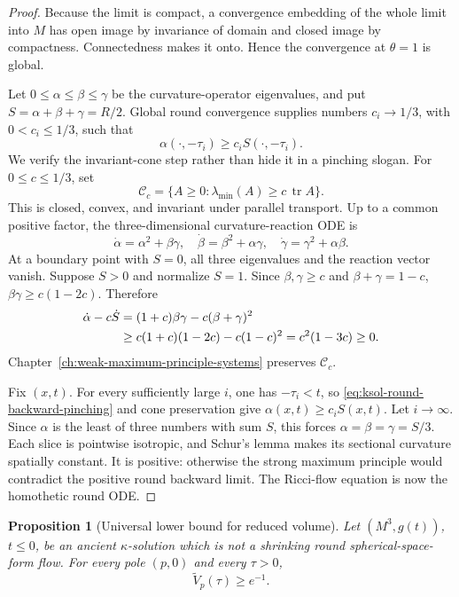 \documentclass[10pt]{coll-l}
\newtheorem{proposition}[theorem]{Proposition}
\theoremstyle{definition}
\theoremstyle{remark}
\numberwithin{section}{chapter}
\numberwithin{equation}{chapter}
\begin{document}
\begin{proof}
Because the limit is compact, a convergence embedding of the whole limit
into $M$ has open image by invariance of domain and closed image by
compactness.  Connectedness makes it onto.  Hence the convergence at
$\theta=1$ is global.

Let $0\leq\alpha\leq\beta\leq\gamma$ be the curvature-operator eigenvalues,
and put $S=\alpha+\beta+\gamma=R/2$.  Global round convergence supplies
numbers $c_i\to1/3$, with $0<c_i\leq1/3$, such that
\begin{equation}
              \alpha(\cdot,-\tau_i)\geq c_iS(\cdot,-\tau_i).
                                                        \label{eq:ksol-round-backward-pinching}
\end{equation}
We verify the invariant-cone step rather than hide it in a pinching slogan.
For $0\leq c\leq1/3$, set
\[
 \mathcal C_c=\{A\geq0:\lambda_{\min}(A)\geq c\,\operatorname{tr}A\}.
\]
This is closed, convex, and invariant under parallel transport.  Up to a
common positive factor, the three-dimensional curvature-reaction ODE is
\[
 \dot\alpha=\alpha^2+\beta\gamma,\quad
 \dot\beta=\beta^2+\alpha\gamma,\quad
 \dot\gamma=\gamma^2+\alpha\beta.
\]
At a boundary point with $S=0$, all three eigenvalues and the reaction
vector vanish.  Suppose $S>0$ and normalize $S=1$.  Since
$\beta,\gamma\geq c$ and $\beta+\gamma=1-c$,
$\beta\gamma\geq c(1-2c)$.  Therefore
\begin{align}
 \dot\alpha-c\dot S
  &=(1+c)\beta\gamma-c(\beta+\gamma)^2 \notag\\
  &\geq c(1+c)(1-2c)-c(1-c)^2
    =c^2(1-3c)\geq0.                                 \label{eq:ksol-round-cone-boundary}
\end{align}
Chapter~\ref{ch:weak-maximum-principle-systems} preserves
$\mathcal C_c$.

Fix $(x,t)$.  For every sufficiently large $i$, one has $-\tau_i<t$, so
\eqref{eq:ksol-round-backward-pinching} and cone preservation give
$\alpha(x,t)\geq c_iS(x,t)$.  Let $i\to\infty$.  Since $\alpha$ is the
least of three numbers with sum $S$, this forces
$\alpha=\beta=\gamma=S/3$.  Each slice is pointwise isotropic, and Schur's
lemma makes its sectional curvature spatially constant.  It is positive:
otherwise the strong maximum principle would contradict the positive round
backward limit.  The Ricci-flow equation is now the homothetic round ODE.
\end{proof}

\begin{proposition}[Universal lower bound for reduced volume]
\label{prop:ksol-universal-reduced-volume-lower}
Let $(M^3,g(t))$, $t\leq0$, be an ancient $\kappa$-solution which is not a
shrinking round spherical-space-form flow.  For every pole $(p,0)$ and
every $\tau>0$,
\begin{equation}
                         \widetilde V_p(\tau)\geq e^{-1}.       \label{eq:ksol-universal-reduced-volume-lower}
\end{equation}
\end{proposition}
\end{document}
